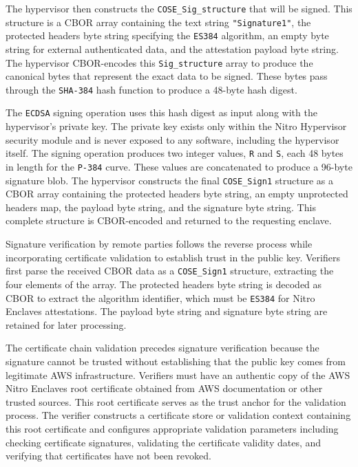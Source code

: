The hypervisor then constructs the \texttt{COSE\_Sig\_structure} that will be signed. This structure is a CBOR array containing the text string \texttt{"Signature1"}, the protected headers byte string specifying the \texttt{ES384} algorithm, an empty byte string for external authenticated data, and the attestation payload byte string. The hypervisor CBOR-encodes this \texttt{Sig\_structure} array to produce the canonical bytes that represent the exact data to be signed. These bytes pass through the \texttt{SHA-384} hash function to produce a 48-byte hash digest.

The \texttt{ECDSA} signing operation uses this hash digest as input along with the hypervisor's private key. The private key exists only within the Nitro Hypervisor security module and is never exposed to any software, including the hypervisor itself. The signing operation produces two integer values, \texttt{R} and \texttt{S}, each 48 bytes in length for the \texttt{P-384} curve. These values are concatenated to produce a 96-byte signature blob. The hypervisor constructs the final \texttt{COSE\_Sign1} structure as a CBOR array containing the protected headers byte string, an empty unprotected headers map, the payload byte string, and the signature byte string. This complete structure is CBOR-encoded and returned to the requesting enclave.

Signature verification by remote parties follows the reverse process while incorporating certificate validation to establish trust in the public key. Verifiers first parse the received CBOR data as a \texttt{COSE\_Sign1} structure, extracting the four elements of the array. The protected headers byte string is decoded as CBOR to extract the algorithm identifier, which must be \texttt{ES384} for Nitro Enclaves attestations. The payload byte string and signature byte string are retained for later processing.


The certificate chain validation precedes signature verification because the signature cannot be trusted without establishing that the public key comes from legitimate AWS infrastructure. Verifiers must have an authentic copy of the AWS Nitro Enclaves root certificate obtained from AWS documentation or other trusted sources. This root certificate serves as the trust anchor for the validation process. The verifier constructs a certificate store or validation context containing this root certificate and configures appropriate validation parameters including checking certificate signatures, validating the certificate validity dates, and verifying that certificates have not been revoked.

